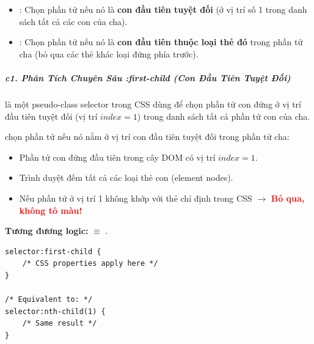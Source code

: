 \begin{conceptBox}
\begin{itemize}[leftmargin=1.5em, itemsep=3pt, parsep=0pt]
    \item {}: Chọn phần tử nếu nó là \textbf{con đầu tiên tuyệt đối} (ở vị trí số 1 trong danh sách tất cả các con của cha).
    \item {}: Chọn phần tử nếu nó là \textbf{con đầu tiên thuộc loại thẻ đó} trong phần tử cha (bỏ qua các thẻ khác loại đứng phía trước).
\end{itemize}
\end{conceptBox}


\subparagraph{c1. Phân Tích Chuyên Sâu :first-child (Con Đầu Tiên Tuyệt Đối)}

 là một pseudo-class selector trong CSS dùng để chọn phần tử con đứng ở vị trí đầu tiên tuyệt đối (vị trí $index = 1$) trong danh sách tất cả phần tử con của cha.

\begin{conceptBox}
 chọn phần tử nếu nó nằm ở vị trí con đầu tiên tuyệt đối trong phần tử cha:
\begin{itemize}[leftmargin=1.5em, itemsep=2pt, parsep=0pt]
    \item Phần tử con đứng đầu tiên trong cây DOM có vị trí $index = 1$.
    \item Trình duyệt đếm tất cả các loại thẻ con (element nodes).
    \item Nếu phần tử ở vị trí 1 không khớp với thẻ chỉ định trong CSS $\rightarrow$ \textcolor{red}{\textbf{Bỏ qua, không tô màu!}}
\end{itemize}
\par\vspace{4pt}
\textbf{Tương đương logic:}  $\equiv$ .
\end{conceptBox}

\begin{codeWindow}
\begin{lstlisting}[language=CSS3]
selector:first-child {
    /* CSS properties apply here */
}

/* Equivalent to: */
selector:nth-child(1) {
    /* Same result */
}
\end{lstlisting}
\end{codeWindow}

